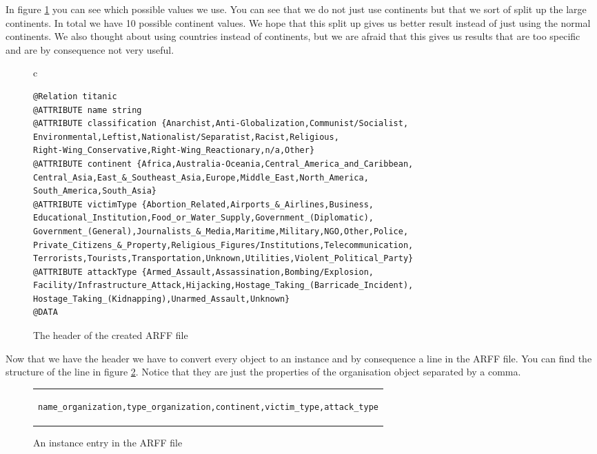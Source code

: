 \documentclass[a4]{article}
\begin{document}
In figure \ref{fig:arff_header} you can see which possible values we use. You can see that we do not just use continents but that we sort of split up the large continents. In total we have 10 possible continent values. We hope that this split up gives us better result instead of just using the normal continents. We also thought about using countries instead of continents, but we are afraid that this gives us results that are too specific and are by consequence not very useful.\par
\begin{figure}[!h]
\centering
\begin{tabular}{c}
\begin{lstlisting}
@Relation titanic
@ATTRIBUTE name string
@ATTRIBUTE classification {Anarchist,Anti-Globalization,Communist/Socialist,
Environmental,Leftist,Nationalist/Separatist,Racist,Religious,
Right-Wing_Conservative,Right-Wing_Reactionary,n/a,Other}
@ATTRIBUTE continent {Africa,Australia-Oceania,Central_America_and_Caribbean,
Central_Asia,East_&_Southeast_Asia,Europe,Middle_East,North_America,
South_America,South_Asia}
@ATTRIBUTE victimType {Abortion_Related,Airports_&_Airlines,Business,
Educational_Institution,Food_or_Water_Supply,Government_(Diplomatic),
Government_(General),Journalists_&_Media,Maritime,Military,NGO,Other,Police,
Private_Citizens_&_Property,Religious_Figures/Institutions,Telecommunication,
Terrorists,Tourists,Transportation,Unknown,Utilities,Violent_Political_Party}
@ATTRIBUTE attackType {Armed_Assault,Assassination,Bombing/Explosion,
Facility/Infrastructure_Attack,Hijacking,Hostage_Taking_(Barricade_Incident),
Hostage_Taking_(Kidnapping),Unarmed_Assault,Unknown}
@DATA
\end{lstlisting}
\end{tabular}
\caption{The header of the created ARFF file}
\label{fig:arff_header}
\end{figure}
\par
Now that we have the header we have to convert every object to an instance and by consequence a line in the ARFF file. You can find the structure of the line in figure \ref{fig:entry}. Notice that they are just the properties of the organisation object separated by a comma.\par
\begin{figure}[!h]
\centering
\begin{tabular}{c}
\begin{lstlisting}
name_organization,type_organization,continent,victim_type,attack_type
\end{lstlisting}
\end{tabular}
\caption{An instance entry in the ARFF file}
\label{fig:entry}
\end{figure}
\end{document}
